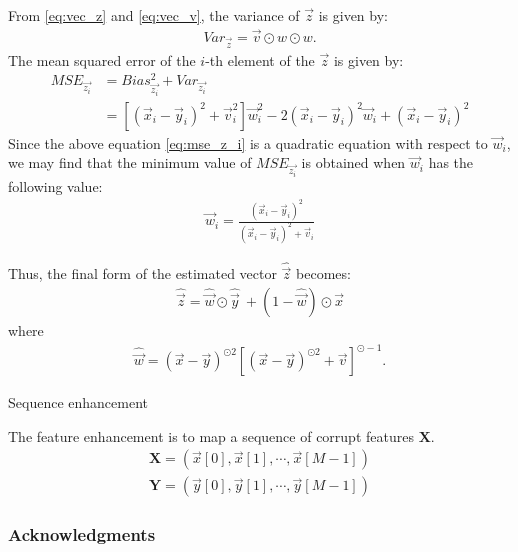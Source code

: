 \documentclass{article}
\begin{document}
From \eqref{eq:vec_z} and \eqref{eq:vec_v}, the variance of $\vec{z}$ is given by:
\begin{align}
  Var_{\vec{z}} = \vec{v} \odot w \odot w.
\end{align}
The mean squared error of the $i$-th element of the $\vec{z}$ is given by:
\begin{align}
  MSE_{\vec{z_i}} & = Bias_{\vec{z_i}}^2 + Var_{\vec{z_i}} \nonumber \\
                 & =  \left[(\vec{x}_i - \vec{y}_i) ^ 2
                    + \vec{v}_i^2 \right] \vec{w}_i^{2}
                    - 2 (\vec{x}_i - \vec{y}_i)^{2}  \vec{w}_i
                    + (\vec{x}_i - \vec{y}_i)^{2}
 \label{eq:mse_z_i}
\end{align}
Since the above equation \eqref{eq:mse_z_i} is a quadratic equation with
respect to $\vec{w}_i$, we may find that the minimum value of $MSE_{\vec{z_i}}$
is obtained when $\vec{w}_i$ has the following value:
\begin{align}
  \vec{w}_i = \frac{(\vec{x}_i - \vec{y}_i)^2}{(\vec{x}_i - \vec{y}_i)^2 + \vec{v}_i}
\end{align}

Thus, the final form of the estimated vector $\widehat{\vec{z}}$ becomes:
\begin{align}
  \widehat{\vec{z}} = \widehat{\vec{w}} \odot \widehat{\vec{y}}
    \ + (1 - \widehat{\vec{w}}) \odot \vec{x}
\end{align}
where
\begin{align}
  \widehat{\vec{w}} = {(\vec{x} - \vec{y})^{\odot 2}}
    \left[(\vec{x} - \vec{y})^{\odot 2}+ \vec{v}\right]^{\odot -1}.
\end{align}


Sequence enhancement

The feature enhancement is to map a sequence of corrupt features $\mathbf{X}$.
\begin{subequations}
  \begin{align}
    \mathbf{X} = \left(\vec{x}[0], \vec{x}[1], \cdots, \vec{x}[M-1] \right)  \\
    \mathbf{Y} = \left(\vec{y}[0], \vec{y}[1], \cdots, \vec{y}[M-1] \right) 
  \end{align}
\end{subequations}

\subsubsection*{Acknowledgments}
\end{document}
